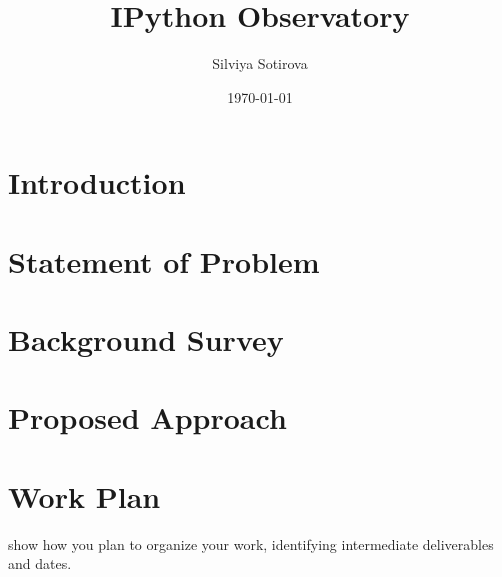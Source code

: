 \documentclass{mprop}
\begin{document}
\title{IPython Observatory}
\author{Silviya Sotirova}
\date{\today}
\maketitle

\tableofcontents
\newpage

\section{Introduction}\label{intro}


\section{Statement of Problem}


\section{Background Survey}


\section{Proposed Approach}


\section{Work Plan}

show how you plan to organize your work, identifying intermediate deliverables and dates.



\end{document}
